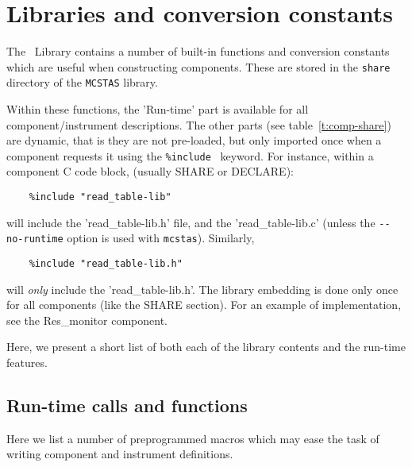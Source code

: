
\chapter{Libraries and conversion constants}
\label{c:kernelcalls}

The \MCS\ Library contains a number of built-in functions
and conversion constants which are useful when constructing
components. These are stored in the \verb+share+ directory of 
the \verb+MCSTAS+ library.  

Within these functions, the 'Run-time' part is available for all
component/instrument descriptions. The other parts (see
table~\ref{t:comp-share}) are dynamic, that is they are not
pre-loaded, but only imported once when a component requests it
using the \verb+%include+ \MCS\ keyword. For instance, within a
component C code block, (usually SHARE or DECLARE):
\begin{verbatim}
    %include "read_table-lib"
\end{verbatim}
will include the 'read\_table-lib.h' file, and the 'read\_table-lib.c'
(unless the \verb+--no-runtime+ option is used with \verb+mcstas+).
Similarly,
\begin{verbatim}
    %include "read_table-lib.h"
\end{verbatim}
will \emph{only} include the 'read\_table-lib.h'.
The library embedding is done only once for all components (like the
 SHARE section).  For an example of implementation, see the Res\_monitor component.

Here, we present a short list of both each of the library contents and the run-time features.

\section{Run-time calls and functions}
\label{s:calls:run-time}
Here we list a number of preprogrammed macros 
which may ease the task of writing component and instrument definitions.

